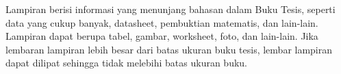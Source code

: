 Lampiran berisi informasi yang menunjang bahasan dalam Buku Tesis, seperti data
yang cukup banyak, datasheet, pembuktian matematis, dan lain-lain. Lampiran
dapat berupa tabel, gambar, worksheet, foto, dan lain-lain. Jika lembaran
lampiran lebih besar dari batas ukuran buku tesis, lembar lampiran dapat
dilipat sehingga tidak melebihi batas ukuran buku.

